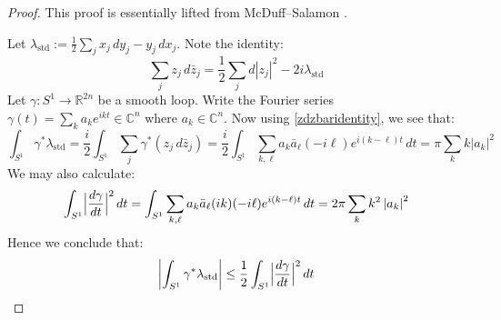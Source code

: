 \documentclass[12pt]{article}
\theoremstyle{definition}
\theoremstyle{remark}
\numberwithin{equation}{subsection}
\newcommand{\CC}{\mathbb C}
\newcommand{\std}{\mathrm{std}}
\begin{document}
\begin{proof}
This proof is essentially lifted from McDuff--Salamon \cite[p99, Lemma 4.7.3]{mcduffsalamonJholsymp}.

Let $\lambda_\std:=\frac 12\sum_jx_j\,dy_j-y_j\,dx_j$.  Note the identity:
\begin{equation}\label{zdzbaridentity}
\sum_jz_j\,d\bar z_j=\frac 12\sum_jd\left|z_j\right|^2-2i\lambda_\std
\end{equation}
Let $\gamma:S^1\to\mathbb R^{2n}$ be a smooth loop.  Write the Fourier series $\gamma(t)=\sum_ka_ke^{ikt}\in\CC^n$ where $a_k\in\CC^n$.  Now using \eqref{zdzbaridentity}, we see that:
\begin{equation*}
\int_{S^1}\gamma^\ast\lambda_\std=\frac i2\int_{S^1}\sum_j\gamma^\ast(z_j\,d\bar z_j)=\frac i2\int_{S^1}\sum_{k,\ell}a_k\bar a_\ell(-i\ell)e^{i(k-\ell)t}\,dt=\pi\sum_kk\left|a_k\right|^2
\end{equation*}
We may also calculate:
\begin{equation}
\int_{S^1}\Bigl|\frac{d\gamma}{dt}\Bigr|^2\,dt=\int_{S^1}\sum_{k,\ell}a_k\bar a_\ell(ik)(-i\ell)e^{i(k-\ell)t}\,dt=2\pi\sum_kk^2\left|a_k\right|^2
\end{equation}
Hence we conclude that:
\begin{equation}\label{sympisoperimetric}
\left|\int_{S^1}\gamma^\ast\lambda_\std\right|\leq\frac 12\int_{S^1}\Bigl|\frac{d\gamma}{dt}\Bigr|^2\,dt
\end{equation}


\end{proof}
\end{document}
